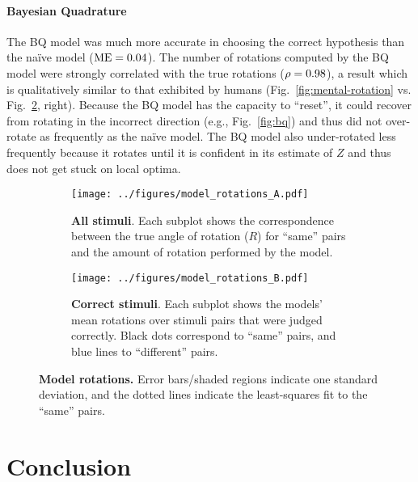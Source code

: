 \documentclass{article} %
\newcommand{\naive}[0]{na\"ive}
\begin{document}
\paragraph{Bayesian Quadrature}

The BQ model was much more accurate in choosing the correct hypothesis
than the \naive{} model ($\mathrm{ME}{}=0.04{}$). The number of rotations computed
by the BQ model were strongly correlated with the true rotations
($\rho=0.98$), a result which is qualitatively similar to that exhibited
by humans (Fig.~\ref{fig:mental-rotation}
vs. Fig.~\ref{fig:correct-stimuli}, right). Because the BQ model has
the capacity to ``reset'', it could recover from rotating in the
incorrect direction (e.g., Fig.~\ref{fig:bq}) and thus did not
over-rotate as frequently as the \naive{} model.  The BQ model also
under-rotated less frequently because it rotates until it is confident
in its estimate of $Z$ and thus does not get stuck on local optima.

\begin{figure}[t]
  \centering
  \begin{subfigure}[b]{0.46\textwidth}
    \centering
    \texttt{[image: ../figures/model\_rotations\_A.pdf]}
    \caption{\textbf{All stimuli}. Each subplot shows the
      correspondence between the true angle of rotation ($R$) for
      ``same'' pairs and the amount of rotation performed by the
      model.}
    \label{fig:all-stimuli}
  \end{subfigure}
  \hspace{0.05\textwidth}
  \begin{subfigure}[b]{0.46\textwidth}
    \centering
    \texttt{[image: ../figures/model\_rotations\_B.pdf]}
    \caption{\textbf{Correct stimuli}. Each subplot shows the models'
      mean rotations over stimuli pairs that were judged
      correctly. Black dots correspond to ``same'' pairs, and blue
      lines to ``different'' pairs.}
    \label{fig:correct-stimuli}
  \end{subfigure}
  \caption{\textbf{Model rotations.} Error bars/shaded regions
    indicate one standard deviation, and the dotted lines indicate the
    least-squares fit to the ``same'' pairs.}
  \label{fig:rotations}
\end{figure}


\section{Conclusion}
\end{document}
